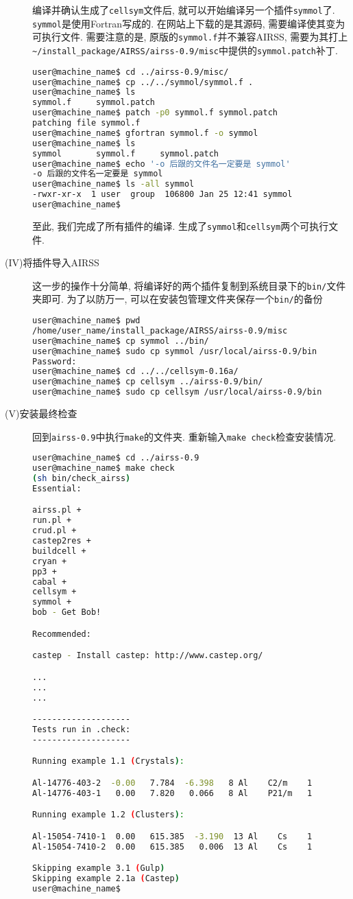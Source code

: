 \documentclass[a4paper, 10pt]{article}
\begin{document}
\begin{description}
编译并确认生成了\verb|cellsym|文件后, 就可以开始编译另一个插件\verb|symmol|了.
\verb|symmol|是使用Fortran写成的. 在网站上下载的是其源码, 需要编译使其变为可执行文件.
需要注意的是, 原版的\verb|symmol.f|并不兼容AIRSS, 需要为其打上\verb|~/install_package/AIRSS/airss-0.9/misc|中提供的\verb|symmol.patch|补丁.
\begin{lstlisting}[language={bash}]
user@machine_name$ cd ../airss-0.9/misc/
user@machine_name$ cp ../../symmol/symmol.f .
user@machine_name$ ls
symmol.f     symmol.patch
user@machine_name$ patch -p0 symmol.f symmol.patch 
patching file symmol.f
user@machine_name$ gfortran symmol.f -o symmol 
user@machine_name$ ls 
symmol       symmol.f     symmol.patch
user@machine_name$ echo '-o 后跟的文件名一定要是 symmol'
-o 后跟的文件名一定要是 symmol
user@machine_name$ ls -all symmol
-rwxr-xr-x  1 user  group  106800 Jan 25 12:41 symmol
user@machine_name$
\end{lstlisting}

至此, 我们完成了所有插件的编译. 生成了\verb|symmol|和\verb|cellsym|两个可执行文件.

\item[(IV)将插件导入AIRSS]
这一步的操作十分简单, 将编译好的两个插件复制到系统目录下的\verb|bin/|文件夹即可. 为了以防万一, 可以在安装包管理文件夹保存一个\verb|bin/|的备份
\begin{lstlisting}[language={bash}]
user@machine_name$ pwd
/home/user_name/install_package/AIRSS/airss-0.9/misc
user@machine_name$ cp symmol ../bin/
user@machine_name$ sudo cp symmol /usr/local/airss-0.9/bin
Password:
user@machine_name$ cd ../../cellsym-0.16a/
user@machine_name$ cp cellsym ../airss-0.9/bin/
user@machine_name$ sudo cp cellsym /usr/local/airss-0.9/bin
\end{lstlisting}

\item[(V)安装最终检查]
回到\verb|airss-0.9|中执行\verb|make|的文件夹. 重新输入\verb|make check|检查安装情况.
\begin{lstlisting}[language={bash}]
user@machine_name$ cd ../airss-0.9
user@machine_name$ make check
(sh bin/check_airss)
Essential:

airss.pl +
run.pl +
crud.pl +
castep2res +
buildcell +
cryan +
pp3 +
cabal +
cellsym +
symmol +
bob - Get Bob!

Recommended:

castep - Install castep: http://www.castep.org/

...
...
...

--------------------
Tests run in .check:
--------------------

Running example 1.1 (Crystals):

Al-14776-403-2  -0.00   7.784  -6.398   8 Al    C2/m    1
Al-14776-403-1   0.00   7.820   0.066   8 Al    P21/m   1

Running example 1.2 (Clusters):

Al-15054-7410-1  0.00   615.385  -3.190  13 Al    Cs    1
Al-15054-7410-2  0.00   615.385   0.006  13 Al    Cs    1

Skipping example 3.1 (Gulp)
Skipping example 2.1a (Castep)
user@machine_name$
\end{lstlisting}
\end{description}
\end{document}
